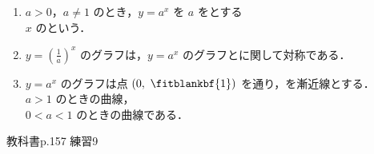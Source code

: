 \documentclass[14pt,dvipdfmx]{jsarticle}
\begin{document}
\begin{summarybox}
  \begin{enumerate}[label=\textbf{\arabic*}, leftmargin=1.5zw, itemsep=0.2em]
    \item $a>0$，$a \neq 1$ のとき，$y=a^x$ を $a$ をとする\\ $x$ のという．
    \item $y=\left(\frac{1}{a}\right)^x$ のグラフは，$y=a^x$ のグラフとに関して対称である．
    \item $y=a^x$ のグラフは点 $(0,\ \fitblankbf{1})$ を通り，を漸近線とする．\\
          $a>1$ のときの曲線，\\
          $0<a<1$ のときの曲線である．
  \end{enumerate}
\end{summarybox}

教科書p.157 練習9

\vfill
{}
\end{document}
